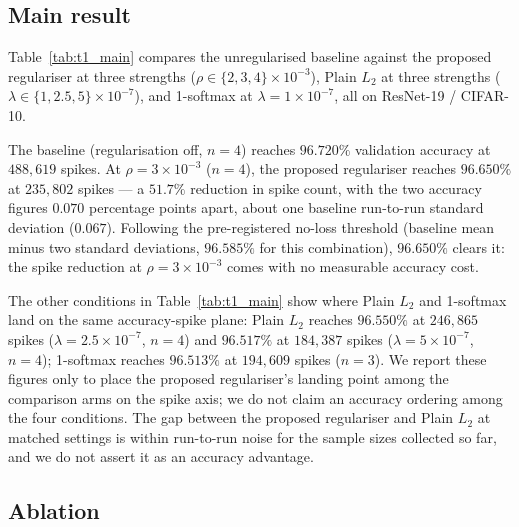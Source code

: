 \subsection{Main result}
\label{sec:exp-main}

Table~\ref{tab:t1_main} compares the unregularised baseline against the
proposed regulariser at three strengths ($\rho \in \{2, 3, 4\}\times
10^{-3}$), Plain $L_2$ at three strengths ($\lambda \in \{1, 2.5,
5\}\times10^{-7}$), and 1-softmax at $\lambda = 1\times10^{-7}$, all on
ResNet-19 / CIFAR-10.

The baseline (regularisation off, $n=4$) reaches $96.720\%$ validation
accuracy at $488{,}619$ spikes. At $\rho=3\times10^{-3}$ ($n=4$), the
proposed regulariser reaches $96.650\%$ at $235{,}802$ spikes --- a
$51.7\%$ reduction in spike count, with the two accuracy figures $0.070$
percentage points apart, about one baseline run-to-run standard deviation
($0.067$). Following the pre-registered no-loss threshold (baseline mean
minus two standard deviations, $96.585\%$ for this combination), $96.650\%$
clears it: the spike reduction at $\rho=3\times10^{-3}$ comes with no
measurable accuracy cost.

The other conditions in Table~\ref{tab:t1_main} show where Plain $L_2$ and
1-softmax land on the same accuracy-spike plane: Plain $L_2$ reaches
$96.550\%$ at $246{,}865$ spikes ($\lambda=2.5\times10^{-7}$, $n=4$) and
$96.517\%$ at $184{,}387$ spikes ($\lambda=5\times10^{-7}$, $n=4$);
1-softmax reaches $96.513\%$ at $194{,}609$ spikes ($n=3$). We report these
figures only to place the proposed regulariser's landing point among the
comparison arms on the spike axis; we do not claim an accuracy ordering
among the four conditions. The gap between the proposed regulariser and
Plain $L_2$ at matched settings is within run-to-run noise for the sample
sizes collected so far, and we do not assert it as an accuracy advantage.



\subsection{Ablation}
\label{sec:exp-ablation}

